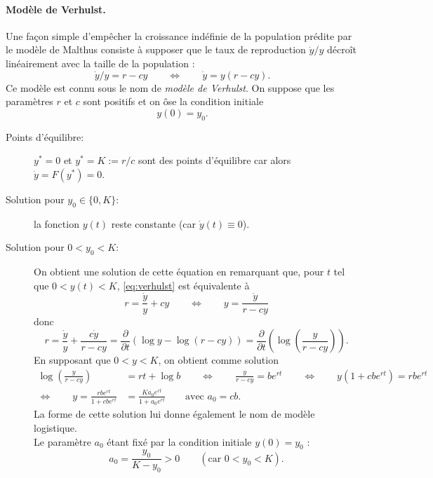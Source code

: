 \paragraph*{Modèle de Verhulst.}
Une façon simple d'empêcher la croissance indéfinie de la population prédite par le modèle de Malthus consiste à supposer que le taux de reproduction $\dot y / y$ décroît linéairement avec la taille de la population : 
\begin{equation} \label{eq:verhulst}
\dot y / y = r - cy
\qquad \Leftrightarrow \qquad
\dot y = y(r - cy).
\end{equation}
Ce modèle est connu sous le nom de {\em modèle de Verhulst}. On suppose que les paramètres $r$ et $c$ sont positifs et on ôse la condition initiale
$$
y(0) = y_0.
$$
\begin{description}
  \item[Points d'équilibre:] $y^* = 0$ et $y^* = K := r/c$ sont des points d'équilibre car alors $\dot y = F(y^*) = 0$.
  \item[Solution pour $y_0 \in \{0, K\}$:] la fonction $y(t)$ reste constante (car $\dot y(t) \equiv 0$).
  \item[Solution pour $0 < y_0 < K$:]
  On obtient une solution de cette équation en remarquant que, pour $t$ tel que $0 < y(t) < K$, \eqref{eq:verhulst} est équivalente à 
  $$
  r = \frac{\dot y}y + cy \qquad \Leftrightarrow \qquad y = \frac{\dot y}{r - cy}
  $$
  donc
  \begin{equation} \label{eq:verhulstSolution}
  r 
  = \frac{\dot y}{y} + \frac{c \dot y}{r - cy}
  = \frac{\partial}{\partial t} \left(\log y - \log (r - cy) \right)
  = \frac{\partial}{\partial t} \left(\log \left(\frac{y}{r - cy}\right)\right).
  \end{equation}
  En supposant que $0 < y < K$, on obtient comme solution 
  \begin{align*}
    \log \left(\frac{y}{r - cy}\right) & = rt + \log b
    \qquad \Leftrightarrow \qquad 
    \frac{y}{r - cy} = b e^{rt}
    \qquad \Leftrightarrow \qquad
    y(1 + c b e^{rt}) = r b e^{rt} \\
    \Leftrightarrow \qquad 
    y = \frac{rb e^{rt}}{1 + cb e^{rt}} & = \frac{K a_0 e^{rt}}{1 + a_0 e^{rt}}
    \qquad \text{avec } a_0 = cb.
  \end{align*}
  La forme de cette solution lui donne également le nom de modèle logistique. \\
  Le paramètre $a_0$ étant fixé par la condition initiale $y(0) = y_0$ : 
  $$
  a_0 = \frac{y_0}{K-y_0} > 0 \qquad (\text{car } 0  < y_0 < K).
$$
\end{description}
